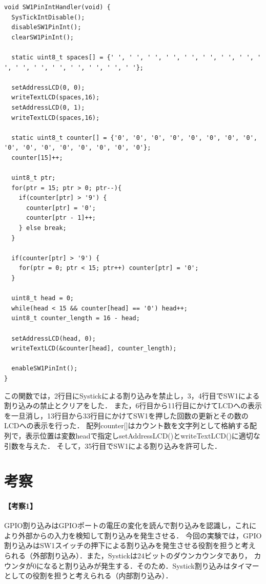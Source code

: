 \documentclass{jlreq}
\begin{document}
\begin{lstlisting}[label=a5counter,caption={【課題5】におけるSW1PinIntHandler関数}]
void SW1PinIntHandler(void) {
  SysTickIntDisable();
  disableSW1PinInt();
  clearSW1PinInt();

  static uint8_t spaces[] = {' ', ' ', ' ', ' ', ' ', ' ', ' ', ' ', ' ', ' ', ' ', ' ', ' ', ' ', ' ', ' '};

  setAddressLCD(0, 0);
  writeTextLCD(spaces,16);
  setAddressLCD(0, 1);
  writeTextLCD(spaces,16);

  static uint8_t counter[] = {'0', '0', '0', '0', '0', '0', '0', '0', '0', '0', '0', '0', '0', '0', '0', '0'};
  counter[15]++;

  uint8_t ptr;
  for(ptr = 15; ptr > 0; ptr--){
    if(counter[ptr] > '9') {
      counter[ptr] = '0';
      counter[ptr - 1]++;
    } else break;
  }

  if(counter[ptr] > '9') {
    for(ptr = 0; ptr < 15; ptr++) counter[ptr] = '0';
  }

  uint8_t head = 0;
  while(head < 15 && counter[head] == '0') head++;
  uint8_t counter_length = 16 - head;

  setAddressLCD(head, 0);
  writeTextLCD(&counter[head], counter_length);

  enableSW1PinInt();
}
\end{lstlisting}

この関数では，2行目にSystickによる割り込みを禁止し，3，4行目でSW1による割り込みの禁止とクリアをした．
また，6行目から11行目にかけてLCDへの表示を一旦消し，13行目から33行目にかけてSW1を押した回数の更新とその数のLCDへの表示を行った．
配列counter[]はカウント数を文字列として格納する配列で，表示位置は変数headで指定しsetAddressLCD()とwriteTextLCD()に適切な引数を与えた．
そして，35行目でSW1による割り込みを許可した．

\section{考察}
\paragraph{【考察1】}GPIO割り込みはGPIOポートの電圧の変化を読んで割り込みを認識し，これにより外部からの入力を検知して割り込みを発生させる．
今回の実験では，GPIO割り込みはSW1スイッチの押下による割り込みを発生させる役割を担うと考えられる（外部割り込み）．また，Systickは24ビットのダウンカウンタであり，
カウンタが0になると割り込みが発生する．そのため．Systick割り込みはタイマーとしての役割を担うと考えられる（内部割り込み）．~\cite{ti}
\end{document}

